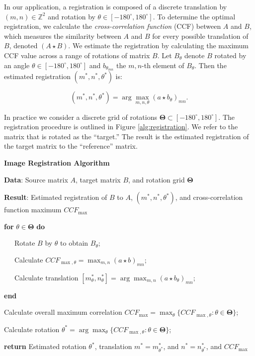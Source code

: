 \documentclass[11pt,]{isuthesis}
\begin{document}
In our application, a registration is composed of a discrete translation by \((m,n) \in \mathbb{Z}^2\) and rotation by \(\theta \in [-180^\circ,180^\circ]\).
To determine the optimal registration, we calculate the \emph{cross-correlation function} (CCF) between \(A\) and \(B\), which measures the similarity between \(A\) and \(B\) for every possible translation of \(B\), denoted \((A \star B)\).
We estimate the registration by calculating the maximum CCF value across a range of rotations of matrix \(B\).
Let \(B_\theta\) denote \(B\) rotated by an angle \(\theta \in [-180^\circ,180^\circ]\) and \(b_{\theta_{mn}}\) the \(m,n\)-th element of \(B_\theta\).
Then the estimated registration \((m^*,n^*,\theta^*)\) is:

\[
(m^*,n^*,\theta^*) = \arg \max_{m,n,\theta} (a \star b_\theta)_{mn}.
\]

In practice we consider a discrete grid of rotations \(\pmb{\Theta} \subset [-180^\circ,180^\circ]\).
The registration procedure is outlined in Figure \ref{alg:registration}.
We refer to the matrix that is rotated as the ``target.''
The result is the estimated registration of the target matrix to the ``reference'' matrix.

\textbf{Image Registration Algorithm}

\textbf{Data}: Source matrix \(A\), target matrix \(B\), and rotation grid \(\pmb{\Theta}\)

\textbf{Result}: Estimated registration of \(B\) to \(A\), \((m^*, n^*, \theta^*)\), and cross-correlation function maximum \(CCF_{\max}\)

\textbf{for} \(\theta \in \pmb{\Theta}\) \textbf{do}

~~~Rotate \(B\) by \(\theta\) to obtain \(B_\theta\);

~~~Calculate \(CCF_{\max,\theta} = \max_{m,n} (a \star b)_{mn}\);

~~~Calculate translation \([m_{\theta}^*, n_{\theta}^*] = \arg \max_{m,n} (a \star b_\theta)_{mn}\);

\textbf{end}

Calculate overall maximum correlation \(CCF_{\max} = \max_{\theta} \{CCF_{\max, \theta} : \theta \in \pmb{\Theta}\}\);

Calculate rotation \(\theta^* = \arg \max_{\theta} \{CCF_{\max,\theta} : \theta \in \pmb{\Theta}\}\);

\textbf{return} Estimated rotation \(\theta^*\), translation \(m^* = m_{\theta^*}^*\), and \(n^* = n_{\theta^*}^*\), and \(CCF_{\max}\)
\end{document}
